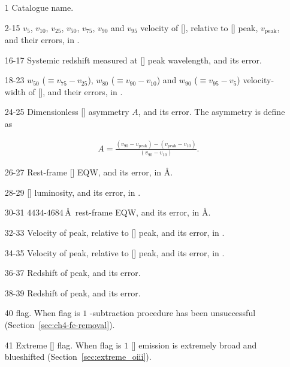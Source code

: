 \begin{itemize}
    
  \item[1] Catalogue name. 

  \item[2-15] $v_{5}$, $v_{10}$, $v_{25}$, $v_{50}$, $v_{75}$, $v_{90}$ and $v_{95}$ velocity of [], relative to [] peak, $v_{\text{peak}}$, and their errors, in \kms.  

  \item[16-17] Systemic redshift measured at [] peak wavelength, and its error. 

  \item[18-23] $w_{50}$ ($\equiv v_{75} - v_{25}$), $w_{80}$ ($\equiv v_{90} - v_{10}$) and $w_{90}$ ($\equiv v_{95} - v_{5}$) velocity-width of [], and their errors, in \kms.

  \item[24-25] Dimensionless [] asymmetry $A$, and its error. The asymmetry is define as 

  \begingroup\makeatletter{}\check@mathfonts
   \begin{eqnarray}
    A = \frac{(v_{90} - v_{\text{peak}}) - (v_{\text{peak}} - v_{10})}{(v_{90} - v_{10})} \nonumber.     
    \end{eqnarray}  
  \endgroup

  \item[26-27] Rest-frame [] EQW, and its error, in \AA.

  \item[28-29] [\ion{O}{III}] luminosity, and its error, in \ergs. 

  \item[30-31] $4434$-$4684$\,\AA\, rest-frame  EQW, and its error, in \AA.  

  \item[32-33] Velocity of \hb peak, relative to [] peak, and its error, in \kms. 

  \item[34-35] Velocity of \ha peak, relative to [] peak, and its error, in \kms. 

  \item[36-37] Redshift of \hb peak, and its error.

  \item[38-39] Redshift of \ha peak, and its error.

  \item[40]  flag. When flag is $1$ -subtraction procedure has been unsuccessful (Section~\ref{sec:ch4-fe-removal}).  

  \item[41] Extreme [] flag. When flag is $1$ [] emission is extremely broad and blueshifted (Section~\ref{sec:extreme_oiii}). 

\end{itemize}

